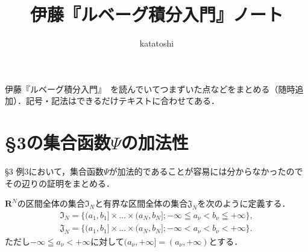 \documentclass[12pt,a4paper]{jsarticle}
\newcommand{\real}{\mathbf{R}}
\newcommand{\frakI}{\mathfrak{I}}
\newcommand{\frakJ}{\mathfrak{J}}
\begin{document}
\title{伊藤『ルベーグ積分入門』ノート}
\author{katatoshi}
\maketitle

伊藤『ルベーグ積分入門』~\cite{伊藤}を読んでいてつまずいた点などをまとめる（随時追加）．記号・記法はできるだけテキストに合わせてある．

\section{\S3の集合函数$\Psi$の加法性}

\S3 例3において，集合函数$\Psi$が加法的であることが容易には分からなかったのでその辺りの証明をまとめる．

$\real^N$の区間全体の集合$\frakI_N$と有界な区間全体の集合$\frakJ_N$を次のように定義する．
\begin{gather*}
    \frakI_N = \{(a_1, b_1] \times \dots \times (a_N, b_N] ; -\infty \leqq a_\nu < b_\nu \leqq +\infty\}, \\
    \frakJ_N = \{(a_1, b_1] \times \dots \times (a_N, b_N] ; -\infty < a_\nu < b_\nu < +\infty\}.
\end{gather*}
ただし$-\infty \leqq a_\nu < +\infty$に対して$(a_\nu, +\infty] = (a_\nu, +\infty)$とする．
\end{document}
